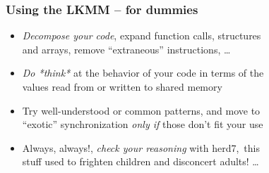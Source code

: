 \documentclass[usenames,dvipsnames]{beamer}
\begin{document}
\begin{frame}[fragile]
\frametitle{Using the LKMM -- for dummies}

\begin{itemize}
	\item \emph{Decompose your code}, expand function calls,
	structures \\ and arrays, remove ``extraneous'' instructions,
	\dots

\vspace{2mm}
	\item \emph{Do *think*} at the behavior of your code in terms
	of the \\ values read from or written to shared memory

\vspace{2mm}
	\item %
	Try well-understood or common patterns, and move to \\
	``exotic'' synchronization \emph{only if} those don't fit your
	use %

\vspace{2mm}
	\item Always, always!, \emph{check your reasoning} with herd7,
	\,this \\
	stuff used to frighten children and disconcert adults! \dots
\end{itemize}

\end{frame}
\end{document}
